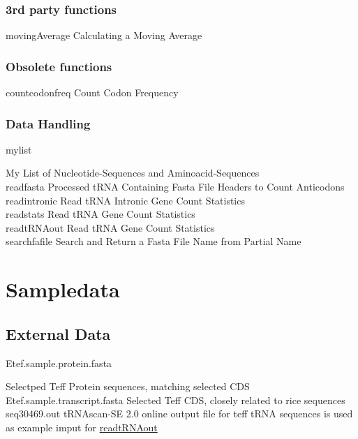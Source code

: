 \subsubsection{3rd party functions}
movingAverage	\quad Calculating a Moving Average \\

\subsubsection{Obsolete functions}
countcodonfreq	\quad Count Codon Frequency \\

\subsubsection{Data Handling}
\hypertarget{function:mylist}{mylist}	\quad My List of Nucleotide-Sequences and Aminoacid-Sequences \\
\hypertarget{function:readfasta}{readfasta}	\quad Processed tRNA Containing Fasta File Headers to Count Anticodons \\
\hypertarget{function:readintronic}{readintronic}	\quad Read tRNA Intronic Gene Count Statistics \\
\hypertarget{function:readstats}{readstats}	\quad Read tRNA Gene Count Statistics \\
\hypertarget{function:rtRNAo}{readtRNAout}	\quad Read tRNA Gene Count Statistics \\
\hypertarget{function:searchfafile}{searchfafile}	\quad Search and Return a Fasta File Name from Partial Name \\

\section{Sampledata}

\subsection{External Data}
\hypertarget{data:RNA}{Etef.sample.protein.fasta} \quad Selectped Teff Protein sequences, matching selected CDS \\
\hypertarget{data:AA}{Etef.sample.transcript.fasta} \quad  Selected Teff CDS, closely related to rice sequences \\
\hypertarget{data:tRNAlist}{seq30469.out} \quad tRNAscan-SE 2.0 online output file for teff tRNA sequences is used as example imput for \hyperlink{function:rtRNAo}{readtRNAout} \\

